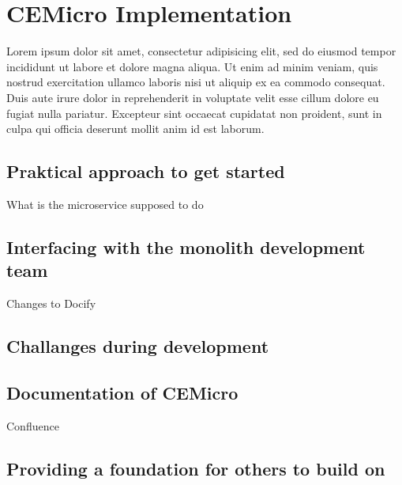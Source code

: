 \chapter{CEMicro Implementation}
\label{sec:impl}

Lorem ipsum dolor sit amet, consectetur adipisicing elit, sed do eiusmod
tempor incididunt ut labore et dolore magna aliqua. Ut enim ad minim veniam,
quis nostrud exercitation ullamco laboris nisi ut aliquip ex ea commodo
consequat. Duis aute irure dolor in reprehenderit in voluptate velit esse
cillum dolore eu fugiat nulla pariatur. Excepteur sint occaecat cupidatat non
proident, sunt in culpa qui officia deserunt mollit anim id est laborum.


\section{Praktical approach to get started}

What is the microservice supposed to do


\section{Interfacing with the monolith development team}

Changes to Docify

\section{Challanges during development}


\section{Documentation of CEMicro}

Confluence

\section{Providing a foundation for others to build on}
